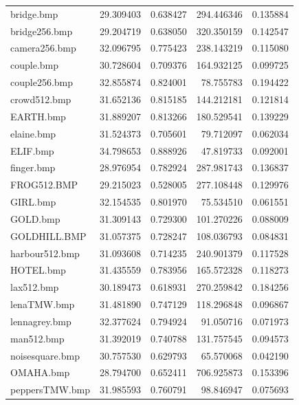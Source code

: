 \documentclass{article}
\begin{document}
\begin{table}[!ht]
\begin{tabular}{@{}lrrrr@{}}
    bridge.bmp         & 29.309403     & 0.638427 & 294.446346 & 0.135884 \\
    bridge256.bmp      & 29.204719     & 0.638050 & 320.350159 & 0.142547 \\
    camera256.bmp      & 32.096795     & 0.775423 & 238.143219 & 0.115080 \\
    couple.bmp         & 30.728604     & 0.709376 & 164.932125 & 0.099725 \\
    couple256.bmp      & 32.855874     & 0.824001 & 78.755783  & 0.194422 \\
    crowd512.bmp       & 31.652136     & 0.815185 & 144.212181 & 0.121814 \\
    EARTH.bmp          & 31.889207     & 0.813266 & 180.529541 & 0.139229 \\
    elaine.bmp         & 31.524373     & 0.705601 & 79.712097  & 0.062034 \\
    ELIF.bmp           & 34.798653     & 0.888926 & 47.819733  & 0.092001 \\
    finger.bmp         & 28.976954     & 0.782924 & 287.981743 & 0.136837 \\
    FROG512.BMP        & 29.215023     & 0.528005 & 277.108448 & 0.129976 \\
    GIRL.bmp           & 32.154535     & 0.801970 & 75.534510  & 0.061551 \\
    GOLD.bmp           & 31.309143     & 0.729300 & 101.270226 & 0.088009 \\
    GOLDHILL.BMP       & 31.057375     & 0.728247 & 108.036793 & 0.084831 \\
    harbour512.bmp     & 31.093608     & 0.714235 & 240.901379 & 0.117528 \\
    HOTEL.bmp          & 31.435559     & 0.783956 & 165.572328 & 0.118273 \\
    lax512.bmp         & 30.189473     & 0.618931 & 270.259842 & 0.184256 \\
    lenaTMW.bmp        & 31.481890     & 0.747129 & 118.296848 & 0.096867 \\
    lennagrey.bmp      & 32.377624     & 0.794924 & 91.050716  & 0.071973 \\
    man512.bmp         & 31.392019     & 0.740788 & 131.757545 & 0.094573 \\
    noisesquare.bmp    & 30.757530     & 0.629793 & 65.570068  & 0.042190 \\
    OMAHA.bmp          & 28.794700     & 0.652411 & 706.925873 & 0.153396 \\
    peppersTMW.bmp     & 31.985593     & 0.760791 & 98.846947  & 0.075693 \\

\end{tabular}
\end{table}
\end{document}
